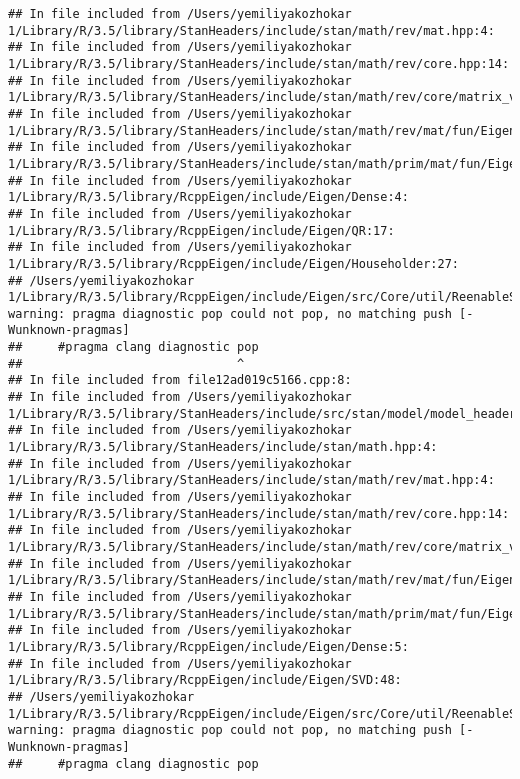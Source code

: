\documentclass[]{article}
\begin{document}
\begin{verbatim}
## In file included from /Users/yemiliyakozhokar 1/Library/R/3.5/library/StanHeaders/include/stan/math/rev/mat.hpp:4:
## In file included from /Users/yemiliyakozhokar 1/Library/R/3.5/library/StanHeaders/include/stan/math/rev/core.hpp:14:
## In file included from /Users/yemiliyakozhokar 1/Library/R/3.5/library/StanHeaders/include/stan/math/rev/core/matrix_vari.hpp:4:
## In file included from /Users/yemiliyakozhokar 1/Library/R/3.5/library/StanHeaders/include/stan/math/rev/mat/fun/Eigen_NumTraits.hpp:4:
## In file included from /Users/yemiliyakozhokar 1/Library/R/3.5/library/StanHeaders/include/stan/math/prim/mat/fun/Eigen.hpp:4:
## In file included from /Users/yemiliyakozhokar 1/Library/R/3.5/library/RcppEigen/include/Eigen/Dense:4:
## In file included from /Users/yemiliyakozhokar 1/Library/R/3.5/library/RcppEigen/include/Eigen/QR:17:
## In file included from /Users/yemiliyakozhokar 1/Library/R/3.5/library/RcppEigen/include/Eigen/Householder:27:
## /Users/yemiliyakozhokar 1/Library/R/3.5/library/RcppEigen/include/Eigen/src/Core/util/ReenableStupidWarnings.h:10:30: warning: pragma diagnostic pop could not pop, no matching push [-Wunknown-pragmas]
##     #pragma clang diagnostic pop
##                              ^
## In file included from file12ad019c5166.cpp:8:
## In file included from /Users/yemiliyakozhokar 1/Library/R/3.5/library/StanHeaders/include/src/stan/model/model_header.hpp:4:
## In file included from /Users/yemiliyakozhokar 1/Library/R/3.5/library/StanHeaders/include/stan/math.hpp:4:
## In file included from /Users/yemiliyakozhokar 1/Library/R/3.5/library/StanHeaders/include/stan/math/rev/mat.hpp:4:
## In file included from /Users/yemiliyakozhokar 1/Library/R/3.5/library/StanHeaders/include/stan/math/rev/core.hpp:14:
## In file included from /Users/yemiliyakozhokar 1/Library/R/3.5/library/StanHeaders/include/stan/math/rev/core/matrix_vari.hpp:4:
## In file included from /Users/yemiliyakozhokar 1/Library/R/3.5/library/StanHeaders/include/stan/math/rev/mat/fun/Eigen_NumTraits.hpp:4:
## In file included from /Users/yemiliyakozhokar 1/Library/R/3.5/library/StanHeaders/include/stan/math/prim/mat/fun/Eigen.hpp:4:
## In file included from /Users/yemiliyakozhokar 1/Library/R/3.5/library/RcppEigen/include/Eigen/Dense:5:
## In file included from /Users/yemiliyakozhokar 1/Library/R/3.5/library/RcppEigen/include/Eigen/SVD:48:
## /Users/yemiliyakozhokar 1/Library/R/3.5/library/RcppEigen/include/Eigen/src/Core/util/ReenableStupidWarnings.h:10:30: warning: pragma diagnostic pop could not pop, no matching push [-Wunknown-pragmas]
##     #pragma clang diagnostic pop

\end{verbatim}
\end{document}
